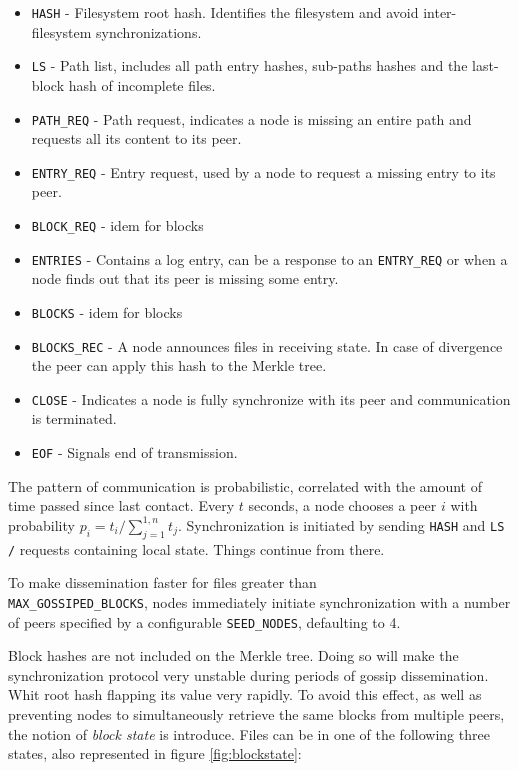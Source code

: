 \documentclass{sig-alternate}
\begin{document}
\begin{itemize}
\item \texttt{HASH} - Filesystem root hash. Identifies the filesystem and avoid inter-filesystem synchronizations. 
\item \texttt{LS} - Path list, includes all path entry hashes, sub-paths hashes and the last-block hash of incomplete files.
\item \texttt{PATH\_REQ} - Path request, indicates a node is missing an entire path and requests all its content to its peer.
\item \texttt{ENTRY\_REQ} - Entry request, used by a node to request a missing entry to its peer.
\item \texttt{BLOCK\_REQ} - idem for blocks
\item \texttt{ENTRIES} - Contains a log entry, can be a response to an \texttt{ENTRY\_REQ} or when a node finds out that its peer is missing some entry.
\item \texttt{BLOCKS} - idem for blocks
\item \texttt{BLOCKS\_REC} - A node announces files in receiving state. In case of divergence the peer can apply this hash to the Merkle tree.
\item \texttt{CLOSE} - Indicates a node is fully synchronize with its peer and communication is terminated.
\item \texttt{EOF} - Signals end of transmission.
\end{itemize}

The pattern of communication is probabilistic, correlated with the amount of time passed since last contact. Every $t$ seconds, a node chooses a peer $i$ with probability $p_i = t_i/\sum_{j=1}^{1,n} t_j$. Synchronization is initiated by sending \texttt{HASH} and \texttt{LS /} requests containing local state. Things continue from there.

To make dissemination faster for files greater than \\ \texttt{MAX\_GOSSIPED\_BLOCKS}, nodes immediately initiate synchronization with a number of peers specified by a configurable \texttt{SEED\_NODES}, defaulting to 4.

Block hashes are not included on the Merkle tree. Doing so will make the synchronization protocol very unstable during periods of gossip dissemination. Whit root hash flapping its value very rapidly. To avoid this effect, as well as preventing nodes to simultaneously retrieve the same blocks from multiple peers, the notion of \textit{block state} is introduce. Files can be in one of the following three states, also represented in figure \ref{fig:blockstate}:
\end{document}
